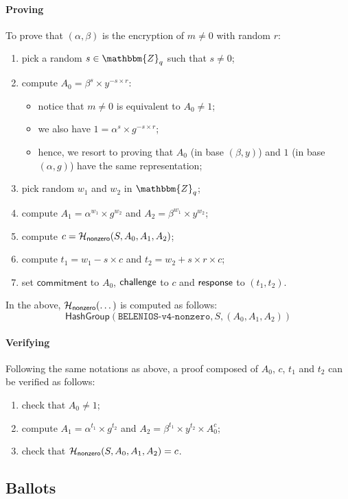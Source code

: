 \documentclass[a4paper]{article}
\newcommand{\Z}{\mathbbm{Z}}
\begin{document}
\paragraph{Proving}
To prove that $(\alpha,\beta)$ is the encryption of $m\neq 0$ with
random $r$:
\begin{enumerate}
\item pick a random $s\in\Z_q$ such that $s\neq 0$;
\item compute $A_0=\beta^s\times y^{-s\times r}$:
  \begin{itemize}
  \item notice that $m\neq 0$ is equivalent to $A_0\neq 1$;
  \item we also have $1=\alpha^s\times g^{-s\times r}$;
  \item hence, we resort to proving that $A_0$ (in base $(\beta,y)$)
    and $1$ (in base $(\alpha,g)$) have the same representation;
  \end{itemize}
\item pick random $w_1$ and $w_2$ in $\Z_q$;
\item compute $A_1=\alpha^{w_1}\times g^{w_2}$ and
  $A_2=\beta^{w_1}\times y^{w_2}$;
\item compute $c=\mathcal{H}_{\textsf{nonzero}}(S,A_0,A_1,A_2)$;
\item compute $t_1=w_1-s\times c$ and $t_2=w_2+s\times r\times c$;
\item set $\textsf{commitment}$ to $A_0$, $\textsf{challenge}$ to $c$ and $\textsf{response}$
  to $(t_1,t_2)$.
\end{enumerate}
In the above, $\mathcal{H}_{\textsf{nonzero}}(\dotsc)$ is computed as follows:
\[
  \textsf{HashGroup}(\texttt{BELENIOS-v4-nonzero},S,(A_0,A_1,A_2))
\]

\paragraph{Verifying} Following the same notations as above, a proof
composed of $A_0$, $c$, $t_1$ and $t_2$ can be verified as follows:
\begin{enumerate}
\item check that $A_0\neq 1$;
\item compute $A_1=\alpha^{t_1}\times g^{t_2}$ and
  $A_2=\beta^{t_1}\times y^{t_2}\times A_0^c$;
\item check that $\mathcal{H}_{\textsf{nonzero}}(S,A_0,A_1,A_2)=c$.
\end{enumerate}

\subsection{Ballots}
\label{ballots}
\end{document}
